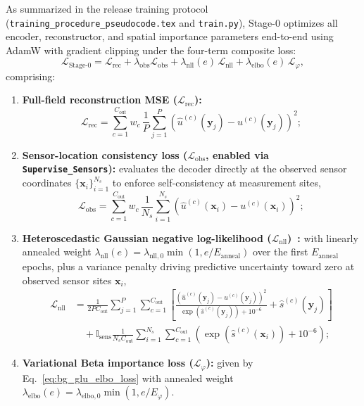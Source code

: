 As summarized in the release training protocol (\texttt{training\_procedure\_pseudocode.tex} and \texttt{train.py}), Stage-0 optimizes all encoder, reconstructor, and spatial importance parameters end-to-end using AdamW with gradient clipping under the four-term composite loss:
\begin{equation}
    \mathcal{L}_{\text{Stage-0}} = \mathcal{L}_{\text{rec}} + \lambda_{\text{obs}} \mathcal{L}_{\text{obs}} + \lambda_{\text{nll}}(e)\, \mathcal{L}_{\text{nll}} + \lambda_{\text{elbo}}(e)\, \mathcal{L}_\varphi,
    \label{eq:bg_glu_stage0_total}
\end{equation}
comprising:
\begin{enumerate}
    \item \textbf{Full-field reconstruction MSE ($\mathcal{L}_{\text{rec}}$):}
    \begin{equation}
        \mathcal{L}_{\text{rec}} = \sum_{c=1}^{C_{\text{out}}} w_c \, \frac{1}{P}\sum_{j=1}^P \left(\hat{u}^{(c)}(\mathbf{y}_j) - u^{(c)}(\mathbf{y}_j)\right)^2;
        \label{eq:bg_glu_lrec}
    \end{equation}
    \item \textbf{Sensor-location consistency loss ($\mathcal{L}_{\text{obs}}$, enabled via \texttt{Supervise\_Sensors}):} evaluates the decoder directly at the observed sensor coordinates $\{\mathbf{x}_i\}_{i=1}^{N_s}$ to enforce self-consistency at measurement sites,
    \begin{equation}
        \mathcal{L}_{\text{obs}} = \sum_{c=1}^{C_{\text{out}}} w_c \, \frac{1}{N_s}\sum_{i=1}^{N_s} \left(\hat{u}^{(c)}(\mathbf{x}_i) - u^{(c)}(\mathbf{x}_i)\right)^2;
        \label{eq:bg_glu_lobs}
    \end{equation}
    \item \textbf{Heteroscedastic Gaussian negative log-likelihood ($\mathcal{L}_{\text{nll}}$)~\cite{kendall2017uncertainties}:} with linearly annealed weight $\lambda_{\text{nll}}(e) = \lambda_{\text{nll},0} \min(1, e / E_{\text{anneal}})$ over the first $E_{\text{anneal}}$ epochs, plus a variance penalty driving predictive uncertainty toward zero at observed sensor sites $\mathbf{x}_i$,
    \begin{equation}
    \begin{aligned}
        \mathcal{L}_{\text{nll}} &= \frac{1}{2 P C_{\text{out}}}\sum_{j=1}^P \sum_{c=1}^{C_{\text{out}}} \left[ \frac{\left(\hat{u}^{(c)}(\mathbf{y}_j) - u^{(c)}(\mathbf{y}_j)\right)^2}{\exp\!\left(\hat{s}^{(c)}(\mathbf{y}_j)\right) + 10^{-6}} + \hat{s}^{(c)}(\mathbf{y}_j) \right] \\
        &\quad + \mathbb{I}_{\text{sens}} \frac{1}{N_s C_{\text{out}}}\sum_{i=1}^{N_s}\sum_{c=1}^{C_{\text{out}}} \left(\exp\!\left(\hat{s}^{(c)}(\mathbf{x}_i)\right) + 10^{-6}\right);
    \end{aligned}
    \label{eq:bg_glu_lnll}
    \end{equation}
    \item \textbf{Variational Beta importance loss ($\mathcal{L}_\varphi$):} given by Eq.~\eqref{eq:bg_glu_elbo_loss} with annealed weight $\lambda_{\text{elbo}}(e) = \lambda_{\text{elbo},0} \min(1, e / E_\varphi)$.
\end{enumerate}

